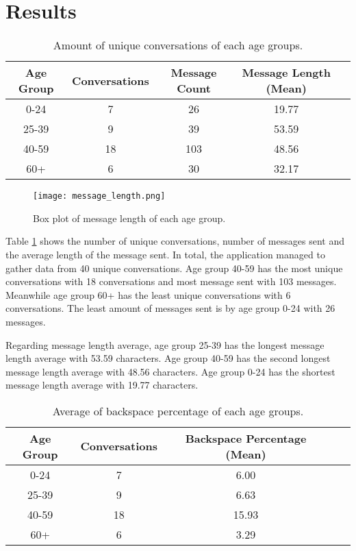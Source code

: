 \section{Results}


\begin{table}[h]
    \centering
    \begin{tabular}{ccccc}
    \toprule
    \textbf{Age Group} & {Conversations} & Message Count & Message Length (Mean) \\
    \midrule
    0-24     & 7 & 26 & 19.77 \\
    25-39    & 9 & 39 & 53.59\\
    40-59    & 18 & 103 & 48.56\\
    60+      & 6 & 30 & 32.17 \\
    \bottomrule
    \end{tabular}
    \caption{Amount of unique conversations of each age groups.}
    \label{tab:unique_conversations}
\end{table}

\begin{figure}[h!]
    \centering
    \texttt{[image: message\_length.png]}
    \caption{Box plot of message length of each age group.}
    \label{box_plot_message_length}
\end{figure}


Table \ref{tab:unique_conversations} shows the number of unique conversations, number of messages sent and the average length of the message sent.
In total, the application managed to gather data from 40 unique conversations.
Age group 40-59 has the most unique conversations with 18 conversations and most message sent with 103 messages.
Meanwhile age group 60+ has the least unique conversations with 6 conversations.
The least amount of messages sent is by age group 0-24 with 26 messages.

Regarding message length average, age group 25-39 has the longest message length average with 53.59 characters.
Age group 40-59 has the second longest message length average with 48.56 characters.
Age group 0-24 has the shortest message length average with 19.77 characters.

\begin{table}[h]
    \centering
    \begin{tabular}{ccccc}
    \toprule
    \textbf{Age Group} & {Conversations} & Backspace Percentage (Mean) \\
    \midrule
    0-24     & 7 & 6.00 \\
    25-39    & 9 & 6.63 \\
    40-59    & 18 & 15.93 \\
    60+      & 6 & 3.29 \\
    \bottomrule
    \end{tabular}
    \caption{Average of backspace percentage of each age groups.}
    \label{tab:backspace_percentage}
\end{table}

